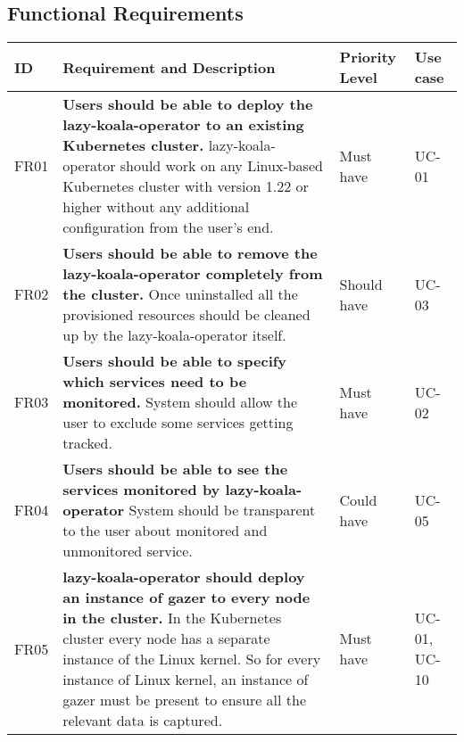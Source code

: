 
\newcommand{\functionalRequirement}[5]{
    #1 &
    \textbf{#2} \newline #3 &
    #4 &
    #5  \\ \hline
}

\newpage
\subsection{Functional Requirements}

\begin{longtable}{|p{9mm}|p{109mm}|p{14mm}|p{13mm}|}
\hline
    \textbf{ID} &
    \textbf{Requirement and Description} &
    \textbf{Priority Level} &
    \textbf{Use case} \\ \hline


    \functionalRequirement
    {FR01}
    {Users should be able to deploy the \ac{lazy-koala-operator} to an existing Kubernetes cluster.}
    {\ac{lazy-koala-operator} should work on any Linux-based Kubernetes cluster with version 1.22 or higher without any additional configuration from the user's end.}
    {Must have}
    {UC-01}
    
    \functionalRequirement
    {FR02}
    {Users should be able to remove the \ac{lazy-koala-operator} completely from the cluster.}
    {Once uninstalled all the provisioned resources should be cleaned up by the \ac{lazy-koala-operator} itself. }
    {Should have}
    {UC-03}
    
        
    \functionalRequirement
    {FR03}
    {Users should be able to specify which services need to be monitored.}
    {System should allow the user to exclude some services getting tracked.}
    {Must have}
    {UC-02}
    
        
    \functionalRequirement
    {FR04}
    {Users should be able to see the services monitored by \ac{lazy-koala-operator}}
    {System should be transparent to the user about monitored and unmonitored service.}
    {Could have}
    {UC-05}
    
        
    \functionalRequirement
    {FR05}
    {\ac{lazy-koala-operator} should deploy an instance of \ac{gazer} to every node in the cluster.}
    {In the Kubernetes cluster every node has a separate instance of the Linux kernel. So for every instance of Linux kernel, an instance of \ac{gazer} must be present to ensure all the relevant data is captured.}
    {Must have}
    {UC-01, UC-10}
    

\end{longtable}
